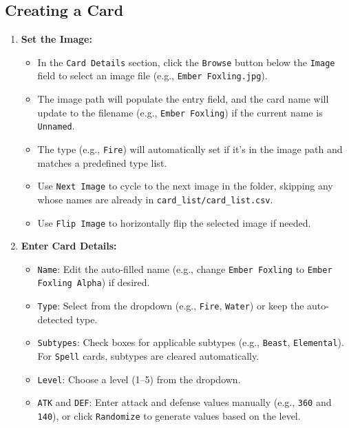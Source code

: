 \subsection{Creating a Card}

\begin{enumerate}
    \item \textbf{Set the Image:}
          \begin{itemize}
              \item In the \texttt{Card Details} section, click the \texttt{Browse} button below the \texttt{Image} field to select an image file (e.g., \texttt{Ember Foxling.jpg}).
              \item The image path will populate the entry field, and the card name will update to the filename (e.g., \texttt{Ember Foxling}) if the current name is \texttt{Unnamed}.
              \item The type (e.g., \texttt{Fire}) will automatically set if it’s in the image path and matches a predefined type list.
              \item Use \texttt{Next Image} to cycle to the next image in the folder, skipping any whose names are already in \texttt{card\_list/card\_list.csv}.
              \item Use \texttt{Flip Image} to horizontally flip the selected image if needed.
          \end{itemize}

    \item \textbf{Enter Card Details:}
          \begin{itemize}
              \item \texttt{Name}: Edit the auto-filled name (e.g., change \texttt{Ember Foxling} to \texttt{Ember Foxling Alpha}) if desired.
              \item \texttt{Type}: Select from the dropdown (e.g., \texttt{Fire}, \texttt{Water}) or keep the auto-detected type.
              \item \texttt{Subtypes}: Check boxes for applicable subtypes (e.g., \texttt{Beast}, \texttt{Elemental}). For \texttt{Spell} cards, subtypes are cleared automatically.
              \item \texttt{Level}: Choose a level (1--5) from the dropdown.
              \item \texttt{ATK} and \texttt{DEF}: Enter attack and defense values manually (e.g., \texttt{360} and \texttt{140}), or click \texttt{Randomize} to generate values based on the level.
          \end{itemize}


\end{enumerate}

